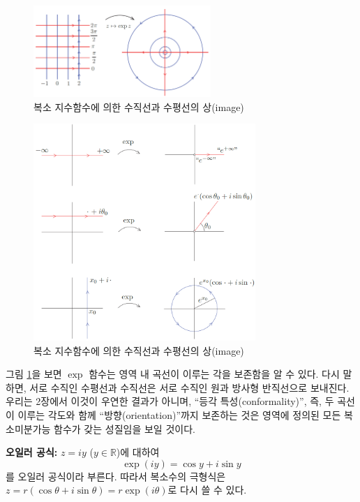 \begin{figure}[!h]
\begin{center}
\includegraphics[width=0.6\textwidth]{./SaltChapter/figs/fig-1-16}
\end{center}
\caption{복소 지수함수에 의한 수직선과 수평선의 상(image)}
\label{fig-1-16}
\end{figure}

\begin{figure}[!h]
\begin{center}
\includegraphics[width=0.75\textwidth]{./SaltChapter/figs/fig-1-17}
\end{center}
\caption{복소 지수함수에 의한 수직선과 수평선의 상(image)}
\label{fig-1-17}
\end{figure}

그림 \ref{fig-1-16}을 보면
$\exp$ 함수는 영역 내 곡선이 이루는 각을 보존함을 알 수 있다.
다시 말하면, 서로 수직인 수평선과 수직선은 서로 수직인 원과 방사형 반직선으로 보내진다.
우리는 2장에서 이것이 우연한 결과가 아니며, ``등각 특성(conformality)'', 즉, 
두 곡선이 이루는 각도와 함께 ``방향(orientation)''까지 보존하는 것은
영역에 정의된 모든 복소미분가능 함수가 갖는 성질임을 보일 것이다.

{\bf 오일러 공식: }
$z=iy$ ($y\in \mathbb R$)에 대하여
$$
\exp(iy) = \cos y + i \sin y
$$
를 오일러 공식이라 부른다.
따라서 복소수의 극형식은 $z=r(\cos\theta + i\sin\theta) = r\exp(i\theta)$로
다시 쓸 수 있다.

